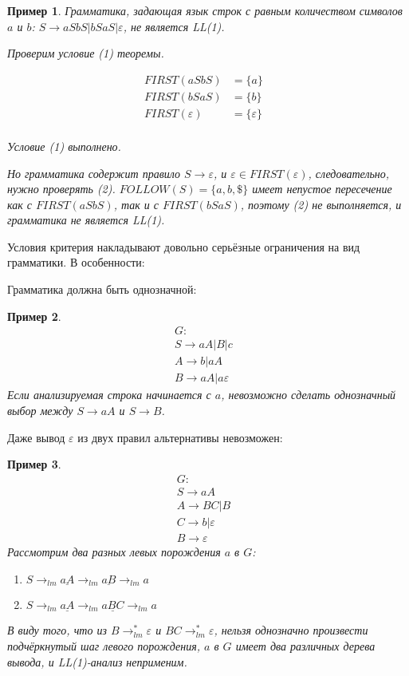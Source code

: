 \documentclass[10pt]{article}         %
\newtheorem{example}{Пример}
\begin{document}
	\begin{example}
		Грамматика, задающая язык строк с равным количеством символов $a$ и $b$: $S \to aSbS|bSaS|\varepsilon$, не является LL(1).
		
		Проверим  условие (1) теоремы.
		
		\begin{align*}
			FIRST(aSbS)  &= \{ a \} & \\
			FIRST(bSaS) &= \{ b \} & \\
			FIRST(\varepsilon)  &= \{ \varepsilon \}  & \\
		\end{align*}
		
		Условие (1) выполнено.
		
		Но грамматика содержит правило $S \to \varepsilon$, и $\varepsilon \in FIRST(\varepsilon)$, следовательно, нужно проверять (2).
		$FOLLOW(S)=\{a,b,\$\}$ имеет непустое пересечение как с $FIRST(aSbS)$, так и с $FIRST(bSaS)$, поэтому (2) не выполняется, и грамматика не является LL(1).
	\end{example}
	
	Условия критерия накладывают довольно серьёзные ограничения на вид грамматики. В особенности:
	
	Грамматика должна быть однозначной:
	
	\begin{example}
		\begin{align*}
			G: & \\
			S \to aA | B | c & \\
			A \to b|aA & \\
			B \to aA|a\varepsilon &
		\end{align*}
		Если анализируемая строка начинается с $a$, невозможно сделать однозначный выбор между $S \to aA$ и $ S\to B$. 
	\end{example}
	
	
	
	Даже вывод $\varepsilon$ из двух правил альтернативы невозможен:
	
	\begin{example}
		\begin{align*}
			G: & \\
			S \to aA & \\
			A \to BC|B & \\
			C \to b|\varepsilon & \\
			B \to \varepsilon &
		\end{align*}
		Рассмотрим два разных левых порождения $a$ в $G$:
		\begin{enumerate}
			\item $S \to_{lm} \underline{aA} \to_{lm} \underline{aB} \to_{lm} a$
			\item $S \to_{lm} \underline{aA} \to_{lm} \underline{aBC} \to_{lm} a$
		\end{enumerate}
		В виду того, что из $B\to_{lm}^*\varepsilon$ и $BC\to_{lm}^*\varepsilon$, нельзя однозначно произвести подчёркнутый шаг левого порождения, $a$ в $G$ имеет два различных дерева вывода, и LL(1)-анализ неприменим.
	\end{example} 
	
\end{document}
